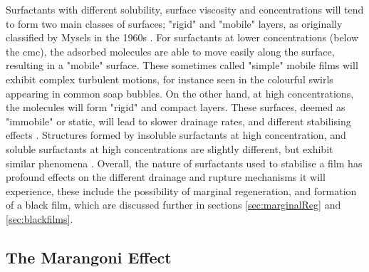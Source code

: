 \documentclass[a4paper,12pt]{article}
\numberwithin{equation}{section}
\numberwithin{figure}{section}
\numberwithin{table}{section}
\begin{document}
Surfactants with different solubility, surface viscosity and concentrations will tend to form two main classes of surfaces; "rigid" and "mobile" layers, as originally classified by Mysels in the 1960s \cite{Mysels1959Book}. For surfactants at lower concentrations (below the cmc), the adsorbed molecules are able to move easily along the surface, resulting in a "mobile" surface. These sometimes called "simple" mobile films \cite{Langevin1994} will exhibit complex turbulent motions, for instance seen in the colourful swirls appearing in common soap bubbles. On the other hand, at high concentrations, the molecules will form "rigid" and compact layers. These surfaces, deemed as "immobile" or static, will lead to slower drainage rates, and different stabilising effects \cite{Bhamla2017}. Structures formed by insoluble surfactants at high concentration, and soluble surfactants at high concentrations are slightly different, but exhibit similar phenomena \cite{Bhamla2017, ChampougnyNotBare2016}. Overall, the nature of surfactants used to stabilise a film has profound effects on the different drainage and rupture mechanisms it will experience, these include the possibility of marginal regeneration, and formation of a black film, which are discussed further in sections \ref{sec:marginalReg} and \ref{sec:blackfilms}.

\subsection{The Marangoni Effect}
\label{sec:marangoni}





\newpage
\end{document}

